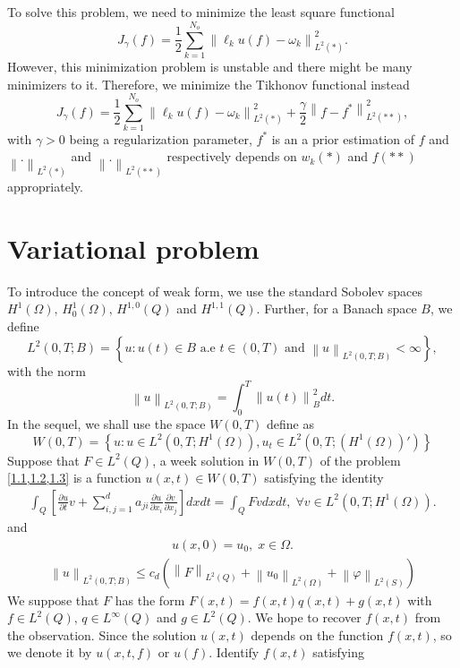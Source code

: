 \documentclass[]{article}
\begin{document}
To solve this problem, we need to minimize the least square functional 
$$J_{\gamma}(f)=\frac{1}{2}\sum_{k=1}^{N_{o}}\left\|\ell_k u(f)-\omega_k\right\|_{L^2(*)}^2.$$
However, this minimization problem is unstable and there might be many minimizers to it. Therefore, we minimize the Tikhonov functional instead
$$J_{\gamma}(f)=\frac{1}{2}\sum_{k=1}^{N_{o}}\left\|\ell_k u(f)-\omega_k\right\|_{L^2(*)}^2+\frac{\gamma}{2}\left\|f-f^*\right\|_{L^2(**)}^2,$$
with $\gamma>0$ being a regularization parameter, $f^*$ is an a prior estimation of $f$ and $\left\|.\right\|_{L^2(*)}$ and $\left\|.\right\|_{L^2(**)}$ respectively depends on $w_k(*)$ and $f(**)$ appropriately.

\section{Variational problem}
To introduce the concept of weak form, we use the standard Sobolev spaces $H^1(\Omega),\, H^1_0(\Omega),\, H^{1, 0}(Q)$ and $H^{1, 1}(Q)$. Further, for a Banach space $B$, we define
$$L^2(0, T; B)=\left\{u:u(t)\in B \text{ a.e } t\in (0, T) \text{ and } \left\|u\right\|_{L^2(0, T; B)} <\infty \right\},$$
with the norm
$$\left\|u\right\|_{L^2(0, T; B)}=\int_0^T\left\|u(t)\right\|^2_Bdt.$$
In the sequel, we shall use the space $W(0, T)$ define as
$$W(0, T)=\left\{u: u\in L^2(0, T; H^1(\Omega)), u_t\in L^2\left(0, T; \left(H^1(\Omega)\right)'\right) \right\}$$
Suppose that $F\in L^2(Q)$, a week solution in $W(0, T)$ of the problem \cref{1.1,1.2,1.3} is a function $u(x, t)\in W(0, T)$ satisfying the identity
\begin{align}\label{2.1}
	\int_{Q}\left[\frac{\partial u}{\partial t}v+\sum_{i, j=1}^{d}a_{ji}\frac{\partial u}{\partial x_i}\frac{\partial v}{\partial x_j}\right]dxdt=\int_{Q}Fvdxdt,\;\forall v \in L^2\left(0, T; H^1(\Omega)\right).
\end{align}
and 
\begin{align}\label{2.2}
	u(x, 0)=u_0,\; x\in \Omega.
\end{align}
\begin{align}\label{2.3}
	\left\|u\right\|_{L^2(0, T; B)} \leq c_d \left(\left\|F\right\|_{L^2(Q)}+\left\|u_0\right\|_{L^2(\Omega)}+\left\|\varphi\right\|_{L^2(S)}\right)
\end{align}
We suppose that $F$ has the form $F(x, t)=f(x, t)q(x, t)+g(x, t)$ with $f\in L^2(Q),\, q\in L^\infty(Q)$ and $g\in L^2(Q)$. We hope to recover $f(x, t)$ from the observation. Since the solution $u(x, t)$ depends on the function $f(x, t)$, so we denote it by $u(x, t, f)$ or $u(f)$. Identify $f(x, t)$ satisfying 
\end{document}
